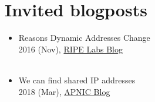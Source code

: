 

\section*{Invited blogposts}
\label{sec:blogs}
\begin{itemize}
 \setlength\itemsep{0em}

\item Reasons Dynamic Addresses Change \\
2016 (Nov), \href{https://labs.ripe.net/Members/ramakrishna_padmanabhan/reasons-dynamic-addresses-change}{RIPE Labs Blog} \\
\\

\item We can find shared IP addresses \\
2018 (Mar), \href{https://blog.apnic.net/2018/03/05/can-find-shared-ip-addresses/}{APNIC Blog} \\
\\

\end{itemize}


